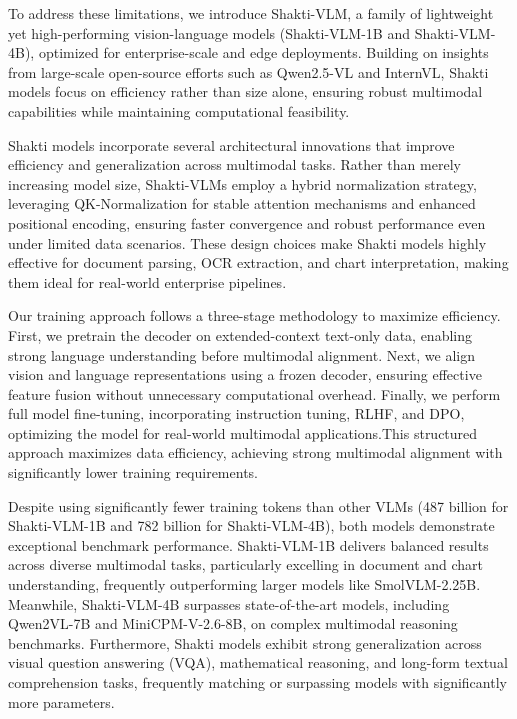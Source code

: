 \documentclass{article}
\begin{document}
To address these limitations, we introduce Shakti-VLM, a family of lightweight yet high-performing vision-language models (Shakti-VLM-1B and Shakti-VLM-4B), optimized for enterprise-scale and edge deployments. Building on insights from large-scale open-source efforts such as Qwen2.5-VL and InternVL, Shakti models focus on efficiency rather than size alone, ensuring robust multimodal capabilities while maintaining computational feasibility.

Shakti models incorporate several architectural innovations that improve efficiency and generalization across multimodal tasks. Rather than merely increasing model size, Shakti-VLMs employ a hybrid normalization strategy, leveraging QK-Normalization\cite{henry2020querykeynormalizationtransformers} for stable attention mechanisms and enhanced positional encoding, ensuring faster convergence and robust performance even under limited data scenarios. These design choices make Shakti models highly effective for document parsing, OCR extraction, and chart interpretation, making them ideal for real-world enterprise pipelines.

Our training approach follows a three-stage methodology to maximize efficiency. First, we pretrain the decoder on extended-context text-only data, enabling strong language understanding before multimodal alignment. Next, we align vision and language representations using a frozen decoder, ensuring effective feature fusion without unnecessary computational overhead. Finally, we perform full model fine-tuning, incorporating instruction tuning, RLHF\cite{rlhf}, and DPO\cite{dpo}, optimizing the model for real-world multimodal applications.This structured approach maximizes data efficiency, achieving strong multimodal alignment with significantly lower training requirements.

Despite using significantly fewer training tokens than other VLMs (487 billion for Shakti-VLM-1B and 782 billion for Shakti-VLM-4B), both models demonstrate exceptional benchmark performance. Shakti-VLM-1B delivers balanced results across diverse multimodal tasks, particularly excelling in document and chart understanding, frequently outperforming larger models like SmolVLM-2.25B\cite{smolvlm}. Meanwhile, Shakti-VLM-4B surpasses state-of-the-art models, including Qwen2VL-7B\cite{wang2024qwen2vlenhancingvisionlanguagemodels} and MiniCPM-V-2.6-8B\cite{yao2024minicpm26}, on complex multimodal reasoning benchmarks. Furthermore, Shakti models exhibit strong generalization across visual question answering (VQA), mathematical reasoning, and long-form textual comprehension tasks, frequently matching or surpassing models with significantly more parameters.
\end{document}
